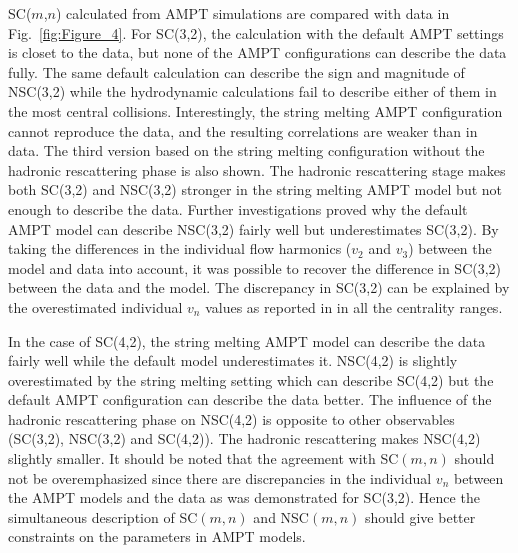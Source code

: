 SC($m$,$n$) calculated from AMPT simulations are compared with data in Fig.~\ref{fig:Figure_4}.
For SC(3,2), the calculation with the default AMPT settings is closet to the data, but none of the AMPT configurations can describe the data fully. 
The same default calculation can describe the sign and magnitude of NSC(3,2) while the hydrodynamic calculations fail to describe either of them in the most central collisions.
Interestingly, the string melting AMPT configuration cannot reproduce the data, and the resulting correlations are weaker than in data.
The third version based on the string melting configuration without the hadronic rescattering phase is also shown.
The hadronic rescattering stage makes both SC(3,2) and NSC(3,2) stronger in the string melting AMPT model but not enough to describe the data.
Further investigations proved why the default AMPT model can describe NSC(3,2) fairly well but underestimates SC(3,2). By taking the differences in the individual flow harmonics ($v_2$ and $v_3$) between the model and data into account, it was possible to recover the difference in SC(3,2) between the data and the model. The discrepancy in SC(3,2) can be explained by the overestimated individual $v_n$ values as reported in \cite{Adam:2016nfo} in all the centrality ranges. 

In the case of SC(4,2), the string melting AMPT model can describe the data fairly well while the default model underestimates it.
NSC(4,2) is slightly overestimated by the string melting setting which can describe SC(4,2) but the default AMPT configuration can describe the data better.
The influence of the hadronic rescattering phase on NSC(4,2) is opposite to other observables (SC(3,2), NSC(3,2) and SC(4,2)). The hadronic rescattering makes NSC(4,2) slightly smaller.
It should be noted that the agreement with SC$(m,n)$ should not be overemphasized since there are discrepancies in the individual $v_n$ between the AMPT models and the data as was demonstrated for SC(3,2).
Hence the simultaneous description of SC$(m,n)$ and NSC$(m,n)$ should give better constraints on the parameters in AMPT models.

